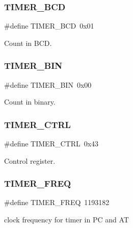 \subsubsection{\texorpdfstring{T\+I\+M\+E\+R\+\_\+\+B\+CD}{TIMER\_BCD}}
{\footnotesize\ttfamily \#define T\+I\+M\+E\+R\+\_\+\+B\+CD~0x01}



Count in B\+CD. 

\hypertarget{group__i8254_gad2913dcf2f91453317bd035589ac0a7d}{}\label{group__i8254_gad2913dcf2f91453317bd035589ac0a7d} 
\subsubsection{\texorpdfstring{T\+I\+M\+E\+R\+\_\+\+B\+IN}{TIMER\_BIN}}
{\footnotesize\ttfamily \#define T\+I\+M\+E\+R\+\_\+\+B\+IN~0x00}



Count in binary. 

\hypertarget{group__i8254_ga282832448fb0281ef53d243c1cd48491}{}\label{group__i8254_ga282832448fb0281ef53d243c1cd48491} 
\subsubsection{\texorpdfstring{T\+I\+M\+E\+R\+\_\+\+C\+T\+RL}{TIMER\_CTRL}}
{\footnotesize\ttfamily \#define T\+I\+M\+E\+R\+\_\+\+C\+T\+RL~0x43}



Control register. 

\hypertarget{group__i8254_gacf926951944b6cf370b7229ebd50dd8b}{}\label{group__i8254_gacf926951944b6cf370b7229ebd50dd8b} 
\subsubsection{\texorpdfstring{T\+I\+M\+E\+R\+\_\+\+F\+R\+EQ}{TIMER\_FREQ}}
{\footnotesize\ttfamily \#define T\+I\+M\+E\+R\+\_\+\+F\+R\+EQ~1193182}



clock frequency for timer in PC and AT 

